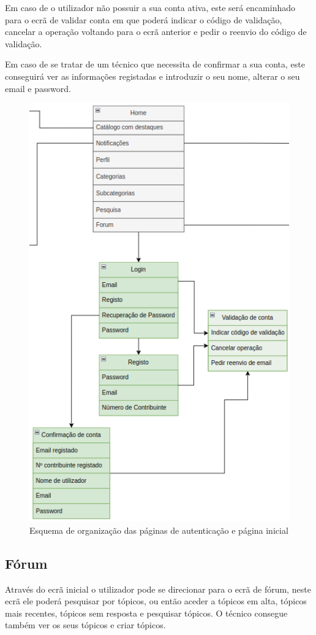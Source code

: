 Em caso de o utilizador não possuir a sua conta ativa, este será encaminhado para o ecrã de validar conta 
em que poderá indicar o código de validação, cancelar a operação voltando para o ecrã anterior e pedir o 
reenvio do código de validação.

Em caso de se tratar de um técnico que necessita de confirmar a sua conta, este conseguirá ver as 
informações registadas e introduzir o seu nome, alterar o seu email e password.

\begin{figure}[htb]
    \centering
    \includegraphics[height=0.9\textwidth]{images/Arquiteturas/superficial_de_app/home_auth.png}
    \caption{Esquema de organização das páginas de autenticação e página inicial}
    \label{fig:4}
\end{figure}

\newpage

\subsection{Fórum}

Através do ecrã inicial o utilizador pode se direcionar para o ecrã de fórum, neste ecrã ele poderá pesquisar
 por tópicos, ou então aceder a tópicos em alta, tópicos mais recentes, tópicos sem resposta e pesquisar tópicos.
O técnico consegue também ver os seus tópicos e criar tópicos.

